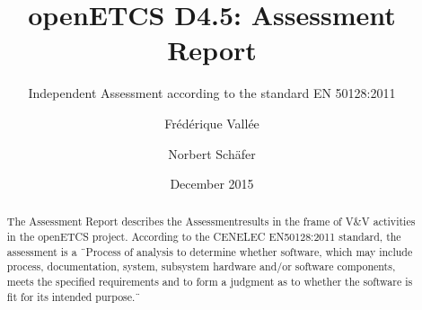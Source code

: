 \documentclass[openetcs]{template/openetcs_article}
\begin{document}
\frontmatter
{}




\title{openETCS D4.5: Assessment Report}

\subtitle{Independent Assessment according to the standard EN 50128:2011}

\date{December 2015}







\author{Fr\'ed\'erique Vall\'ee}


\author{Norbert Sch\"afer}









\begin{abstract}
The Assessment Report describes the Assessmentresults in the frame of V\&V activities in the openETCS \cite{openETCS} project.
According to the CENELEC EN50128:2011 \cite{EN50128} standard, the assessment is a \"\ Process of analysis to determine whether software, which may include
process, documentation, system, subsystem hardware and/or software components, meets the specified requirements and to form a judgment as to whether the
software is fit for its intended purpose.\"\
\\
\end{abstract}
\end{document}
